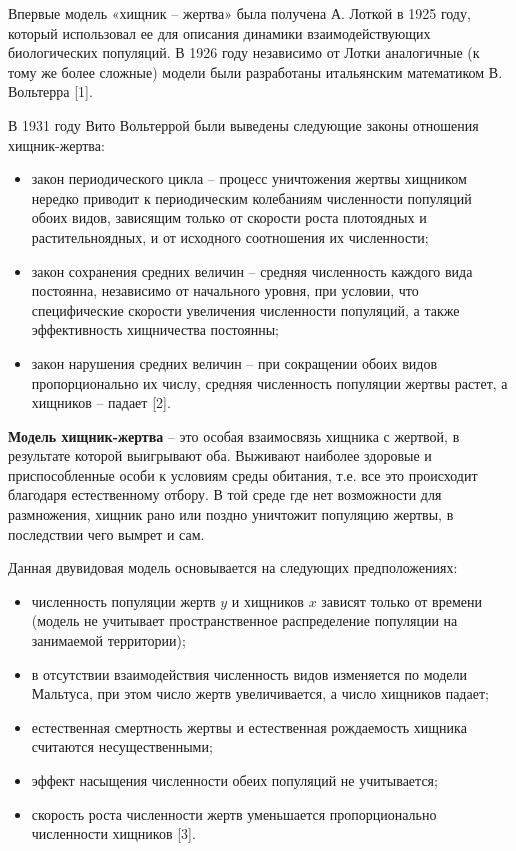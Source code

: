 \documentclass[
  12pt,
  a4paper,
]{scrreprt}
\begin{document}
Впервые модель «хищник – жертва» была получена А. Лоткой в 1925 году,
который использовал ее для описания динамики взаимодействующих
биологических популяций. В 1926 году независимо от Лотки аналогичные (к
тому же более сложные) модели были разработаны итальянским математиком
В. Вольтерра {[}1{]}.

В 1931 году Вито Вольтеррой были выведены следующие законы отношения
хищник-жертва:

\begin{itemize}
\item
  закон периодического цикла – процесс уничтожения жертвы хищником
  нередко приводит к периодическим колебаниям численности популяций
  обоих видов, зависящим только от скорости роста плотоядных и
  растительноядных, и от исходного соотношения их численности;
\item
  закон сохранения средних величин – средняя численность каждого вида
  постоянна, независимо от начального уровня, при условии, что
  специфические скорости увеличения численности популяций, а также
  эффективность хищничества постоянны;
\item
  закон нарушения средних величин – при сокращении обоих видов
  пропорционально их числу, средняя численность популяции жертвы растет,
  а хищников – падает {[}2{]}.
\end{itemize}

\textbf{Модель хищник-жертва} – это особая взаимосвязь хищника с
жертвой, в результате которой выигрывают оба. Выживают наиболее здоровые
и приспособленные особи к условиям среды обитания, т.е. все это
происходит благодаря естественному отбору. В той среде где нет
возможности для размножения, хищник рано или поздно уничтожит популяцию
жертвы, в последствии чего вымрет и сам.

Данная двувидовая модель основывается на следующих предположениях:

\begin{itemize}
\item
  численность популяции жертв \(y\) и хищников \(x\) зависят только от
  времени (модель не учитывает пространственное распределение популяции
  на занимаемой территории);
\item
  в отсутствии взаимодействия численность видов изменяется по модели
  Мальтуса, при этом число жертв увеличивается, а число хищников падает;
\item
  естественная смертность жертвы и естественная рождаемость хищника
  считаются несущественными;
\item
  эффект насыщения численности обеих популяций не учитывается;
\item
  скорость роста численности жертв уменьшается пропорционально
  численности хищников {[}3{]}.
\end{itemize}
\end{document}
